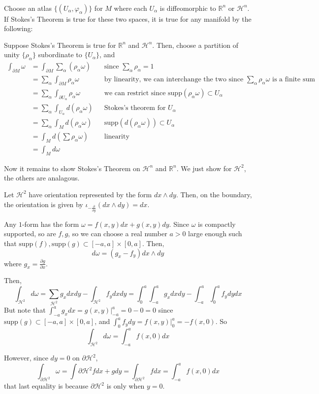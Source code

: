 \documentclass{article}
\begin{document}
\begin{customproof}
  \

  Choose an atlas $\{(U_\alpha, \varphi_\alpha)\}$ for $M$ where each $U_\alpha$ is diffeomorphic to $\mathbb{R}^n$ or $\mathcal{H}^n$. If Stokes's Theorem is true for these two spaces, it is true for any manifold by the following:

  Suppose Stokes's Theorem is true for $\mathbb{R}^n$ and $\mathcal{H}^n$. Then, choose a partition of unity $\{\rho_\alpha\}$ subordinate to $\{U_\alpha\}$, and
  \begin{align*}
    \int_{\partial M} \omega & = \int_{\partial M} \sum_\alpha (\rho_\alpha\omega) && \text{since $\sum_\alpha \rho_\alpha = 1$}\\
    &= \sum_\alpha \int_{\partial M} \rho_\alpha \omega && \text{by linearity, we can interchange the two since $\sum_{\alpha }\rho_\alpha \omega$ is a finite sum}\\
    &= \sum_{\alpha} \int_{\partial U_\alpha} \rho_\alpha \omega && \text{we can restrict since $\text{supp}(\rho_\alpha \omega) \subset U_\alpha$}\\
    &= \sum_\alpha \int_{U_\alpha} d(\rho_\alpha \omega) && \text{Stokes's theorem for $U_\alpha$}\\
    &= \sum_{\alpha} \int_M d(\rho_\alpha \omega) && \text{supp}(d(\rho_\alpha \omega)) \subset U_\alpha\\
    &= \int_M d(\sum \rho_\alpha \omega) && \text{linearity}\\
    &= \int_M d\omega
  \end{align*}

  Now it remains to show Stokes's Theorem on $\mathcal{H}^n$ and $\mathbb{R}^n$. We just show for $\mathcal{H}^2$, the others are analagous.

  Let $\mathcal{H}^2$ have orientation represented by the form $dx \wedge dy$. Then, on the boundary, the orientation is given by $\iota_{-\frac{\partial}{\partial y}}(dx \wedge dy) = dx$.

  Any $1$-form has the form $\omega = f(x,y) dx + g(x,y) dy$. Since $\omega$ is compactly supported, so are $f,g$, so we can choose a real number $a>0$ large enough such that $\text{supp}(f), \text{supp}(g) \subset [-a,a] \times [0,a]$. Then, $$d\omega = (g_x-f_y)dx \wedge dy$$where $g_x = \frac{\partial g}{\partial x}$.

  Then, $$\int_{\mathcal{H}^2} d\omega = \sum_{\mathcal{H}^2} g_x dxdy - \int_{\mathcal{H}^2} f_y dxdy = \int_0^a \int_{-a}^a g_xdxdy - \int_{-a}^a \int_0^a f_y dydx$$But note that $\int_{-a}^a g_x dx = g(x,y) \vert^a_{-a} = 0 - 0 = 0$ since $\text{supp}(g) \subset [-a,a] \times [0,a]$, and $\int_0^a f_y dy = f(x,y) \vert_0^a = -f(x,0)$. So $$\int_{\mathcal{H}^2} d\omega = \int_{-a}^a f(x,0) dx$$

  However, since $dy = 0$ on $\partial \mathcal{H}^2$, $$\int_{\partial \mathcal{H}^2} \omega = \int{\partial \mathcal{H}^2} f dx + g dy = \int_{\partial \mathcal{H}^2} f dx = \int_{-a}^a f(x,0) dx$$that last equality is because $\partial \mathcal{H}^2$ is only when $y = 0$.
\end{customproof}
\end{document}
